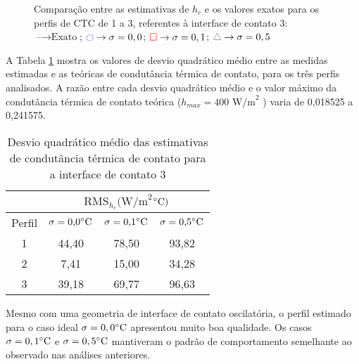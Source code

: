 \begin{figure}[H]
	\caption{Comparação entre as estimativas de $h_c$ e os valores exatos para os perfis de CTC de 1 a 3, referentes à interface de contato 3: $\text{--} \rightarrow \text{Exato}$; $\textcolor{blue}{\ocircle} \rightarrow \sigma = 0,0$; $\textcolor{red}{\square} \rightarrow \sigma = 0,1$; $\textcolor{gray}{\triangle} \rightarrow \sigma = 0,5$}
	\label{figura_ctc_interface_03}
\end{figure}

A Tabela \ref{tabela_rms_ctc_interface_3} mostra os valores de desvio quadrático médio entre as medidas estimadas e as teóricas de condutância térmica de contato, para os três perfis analisados. A razão entre cada desvio quadrático médio e o valor máximo da condutância térmica de contato teórica ($h_{max} = 400 \text{ W/m}^2$ \celsius) varia de 0,018525 a 0,241575.
\begin{table}[H]
	\centering
	\caption{Desvio quadrático médio das estimativas de condutância térmica de contato para a interface de contato 3}
	\begin{tabular}{c|c|c|c|}
		\cline{2-4}
		& \multicolumn{3}{c|}{$\text{RMS}_{h_c}(\text{W/m}^{2}$$\celsius)$} \\ \hline
		\multicolumn{1}{|c|}{Perfil} & $\sigma = \text{0,0}\celsius$   & $\sigma = \text{0,1}\celsius$    & $\sigma = \text{0,5}\celsius$  \\ \hline
		\multicolumn{1}{|c|}{1}      & 44,40       & 78,50       & 93,82      \\ \hline
		\multicolumn{1}{|c|}{2}      & 7,41       & 15,00       & 34,28      \\ \hline
		\multicolumn{1}{|c|}{3}      & 39,18       & 69,77       &  96,63   \\ \hline
	\end{tabular}
	\label{tabela_rms_ctc_interface_3}
\end{table}

Mesmo com uma geometria de interface de contato oscilatória, o perfil estimado para o caso ideal $\sigma = 0,0\celsius$ apresentou muito boa qualidade. Os casos $\sigma = 0,1\celsius$ e $\sigma = 0,5\celsius$  mantiveram o padrão de comportamento semelhante ao observado nas análises anteriores.
